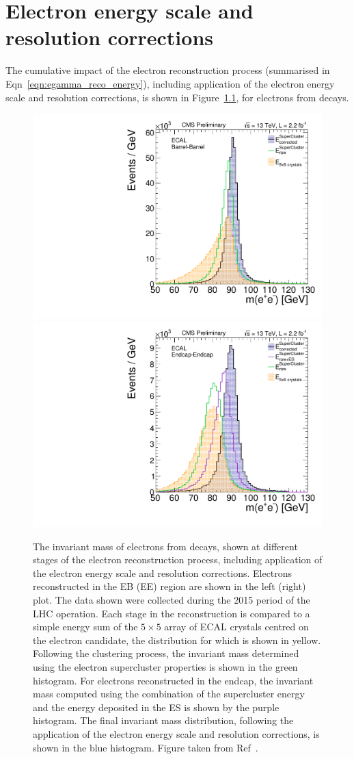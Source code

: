 \chapter{Electron energy scale and resolution corrections}
\label{app:electron_enenergy_scale_corr}

The cumulative impact of the electron reconstruction process (summarised in Eqn~\ref{eqn:egamma_reco_energy}), including application of the electron energy scale and resolution corrections, is shown in Figure~\ref{fig:cms_energy_corrs}, for electrons from \Zee decays. 

\begin{figure}[htbp!]
\centering
\includegraphics[width =0.5\linewidth]{Figures/Hee/simulationCorrections/DY/energy_scale_corrs_breakdown_EB.pdf}\hfill%
\includegraphics[width =0.5\linewidth]{Figures/Hee/simulationCorrections/DY/energy_scale_corrs_breakdown_EE.pdf}\hfill
\caption[The impact of electron energy scale and resolution corrections for electrons from \Zee decays.]{The invariant mass of electrons from \Zee decays, shown at different stages of the electron reconstruction process, including application of the electron energy scale and resolution corrections. Electrons reconstructed in the EB (EE) region are shown in the left (right) plot. The data shown were collected during the 2015 period of the LHC operation. Each stage in the reconstruction is compared to a simple energy sum of the $5\times5$ array of ECAL crystals centred on the electron candidate, the distribution for which is shown in yellow. Following the clustering process, the invariant mass determined using the electron supercluster properties is shown in the green histogram. For electrons reconstructed in the endcap, the invariant mass computed using the combination of the supercluster energy and the energy deposited in the ES is shown by the purple histogram. The final invariant mass distribution, following the application of the electron energy scale and resolution corrections, is shown in the blue histogram. Figure taken from Ref~\cite{Electron_energy_scale_cumulative}.}
\label{fig:cms_energy_corrs}                                              
\end{figure}
